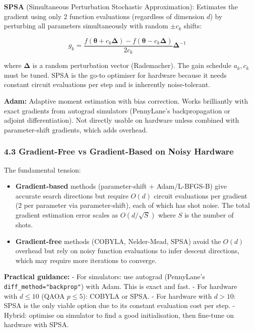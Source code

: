 \documentclass[
  11pt,
]{report}
\begin{document}
\textbf{SPSA} (Simultaneous Perturbation Stochastic Approximation):
Estimates the gradient using only 2 function evaluations (regardless of
dimension \(d\)) by perturbing all parameters simultaneously with random
\(\pm c_k\) shifts:

\[\hat{g}_k = \frac{f(\boldsymbol{\theta} + c_k \boldsymbol{\Delta}) - f(\boldsymbol{\theta} - c_k \boldsymbol{\Delta})}{2c_k} \boldsymbol{\Delta}^{-1}\]

where \(\boldsymbol{\Delta}\) is a random perturbation vector
(Rademacher). The gain schedule \(a_k, c_k\) must be tuned. SPSA is the
go-to optimiser for hardware because it needs constant circuit
evaluations per step and is inherently noise-tolerant.

\textbf{Adam:} Adaptive moment estimation with bias correction. Works
brilliantly with exact gradients from autograd simulators (PennyLane's
backpropagation or adjoint differentiation). Not directly usable on
hardware unless combined with parameter-shift gradients, which adds
overhead.

\subsubsection{4.3 Gradient-Free vs Gradient-Based on Noisy
Hardware}\label{gradient-free-vs-gradient-based-on-noisy-hardware}

The fundamental tension:

\begin{itemize}
\item
  \textbf{Gradient-based} methods (parameter-shift + Adam/L-BFGS-B) give
  accurate search directions but require \(O(d)\) circuit evaluations
  per gradient (2 per parameter via parameter-shift), each of which has
  shot noise. The total gradient estimation error scales as
  \(O(d/\sqrt{S})\) where \(S\) is the number of shots.
\item
  \textbf{Gradient-free} methods (COBYLA, Nelder-Mead, SPSA) avoid the
  \(O(d)\) overhead but rely on noisy function evaluations to infer
  descent directions, which may require more iterations to converge.
\end{itemize}

\textbf{Practical guidance:} - For simulators: use autograd (PennyLane's
\texttt{diff\_method="backprop"}) with Adam. This is exact and fast. -
For hardware with \(d \leq 10\) (QAOA \(p \leq 5\)): COBYLA or SPSA. -
For hardware with \(d > 10\): SPSA is the only viable option due to its
constant evaluation cost per step. - Hybrid: optimise on simulator to
find a good initialisation, then fine-tune on hardware with SPSA.
\end{document}
